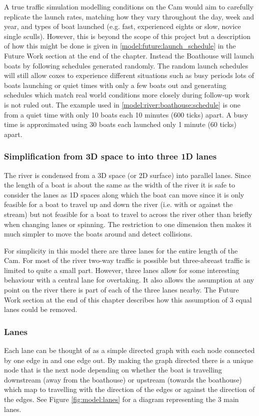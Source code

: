       A true traffic simulation modelling conditions on the Cam would aim to carefully replicate the launch rates, matching how they vary throughout the day, week and year, and types of boat launched (e.g. fast, experienced eights or slow, novice single sculls). However, this is beyond the scope of this project but a description of how this might be done is given in \ref{model:future:launch_schedule} in the Future Work section at the end of the chapter. Instead the Boathouse will launch boats by following schedules generated randomly. The random launch schedules will still allow coxes to experience different situations such as busy periods lots of boats launching or quiet times with only a few boats out and generating schedules which match real world conditions more closely during follow-up work is not ruled out. The example used in \ref{model:river:boathouse:schedule} is one from a quiet time with only 10 boats each 10 minutes (600 ticks) apart. A busy time is approximated using 30 boats each launched only 1 minute (60 ticks) apart.
      
      \subsubsection{Simplification from 3D space to into three 1D lanes}
      The river is condensed from a 3D space (or 2D surface) into parallel lanes. Since the length of a boat is about the same as the width of the river it is safe to consider the lanes as 1D spaces along which the boat can move since it is only feasible for a boat to travel up and down the river (i.e. with or against the stream) but not feasible for a boat to travel to across the river other than briefly when changing lanes or spinning. The restriction to one dimension then makes it much simpler to move the boats around and detect collisions.
      
      For simplicity in this model there are three lanes for the entire length of the Cam. For most of the river two-way traffic is possible but three-abreast traffic is limited to quite a small part. However, three lanes allow for some interesting behaviour with a central lane for overtaking. It also allows the assumption at any point on the river there is part of each of the three lanes nearby. The Future Work section at the end of this chapter describes how this assumption of 3 equal lanes could be removed.
      
      \subsubsection{Lanes}\label{model:river:lanes}
      Each lane can be thought of as a simple directed graph with each node connected by one edge in and one edge out. By making the graph directed there is a unique node that is the next node depending on whether the boat is travelling downstream (away from the boathouse) or upstream (towards the boathouse) which map to travelling with the direction of the edges or against the direction of the edges. See Figure \ref{fig:model:lanes} for a diagram representing the 3 main lanes.
      

